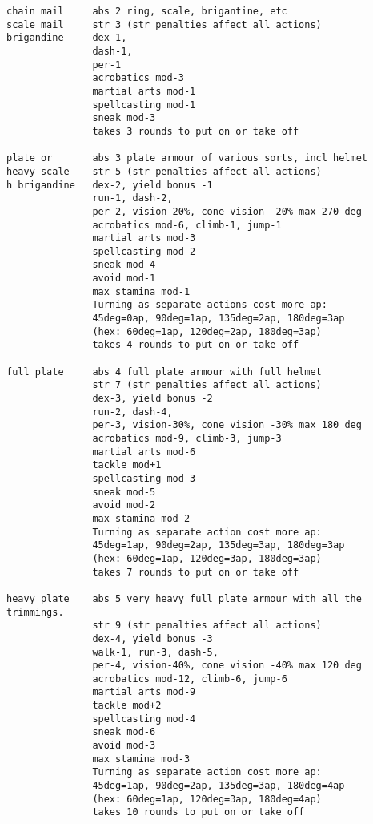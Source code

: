 \begin{verbatim}
chain mail     abs 2 ring, scale, brigantine, etc
scale mail     str 3 (str penalties affect all actions)
brigandine     dex-1,
               dash-1,
               per-1
               acrobatics mod-3
               martial arts mod-1
               spellcasting mod-1
               sneak mod-3
               takes 3 rounds to put on or take off

plate or       abs 3 plate armour of various sorts, incl helmet
heavy scale    str 5 (str penalties affect all actions)
h brigandine   dex-2, yield bonus -1
               run-1, dash-2,
               per-2, vision-20%, cone vision -20% max 270 deg
               acrobatics mod-6, climb-1, jump-1
               martial arts mod-3
               spellcasting mod-2
               sneak mod-4
               avoid mod-1
               max stamina mod-1
               Turning as separate actions cost more ap:
               45deg=0ap, 90deg=1ap, 135deg=2ap, 180deg=3ap
               (hex: 60deg=1ap, 120deg=2ap, 180deg=3ap)
               takes 4 rounds to put on or take off

full plate     abs 4 full plate armour with full helmet
               str 7 (str penalties affect all actions)
               dex-3, yield bonus -2
               run-2, dash-4,
               per-3, vision-30%, cone vision -30% max 180 deg
               acrobatics mod-9, climb-3, jump-3
               martial arts mod-6
               tackle mod+1
               spellcasting mod-3
               sneak mod-5
               avoid mod-2
               max stamina mod-2
               Turning as separate action cost more ap:
               45deg=1ap, 90deg=2ap, 135deg=3ap, 180deg=3ap
               (hex: 60deg=1ap, 120deg=3ap, 180deg=3ap)
               takes 7 rounds to put on or take off

heavy plate    abs 5 very heavy full plate armour with all the trimmings.
               str 9 (str penalties affect all actions)
               dex-4, yield bonus -3
               walk-1, run-3, dash-5,
               per-4, vision-40%, cone vision -40% max 120 deg
               acrobatics mod-12, climb-6, jump-6
               martial arts mod-9
               tackle mod+2
               spellcasting mod-4
               sneak mod-6
               avoid mod-3
               max stamina mod-3
               Turning as separate action cost more ap:
               45deg=1ap, 90deg=2ap, 135deg=3ap, 180deg=4ap
               (hex: 60deg=1ap, 120deg=3ap, 180deg=4ap)
               takes 10 rounds to put on or take off

\end{verbatim}
\normalsize



